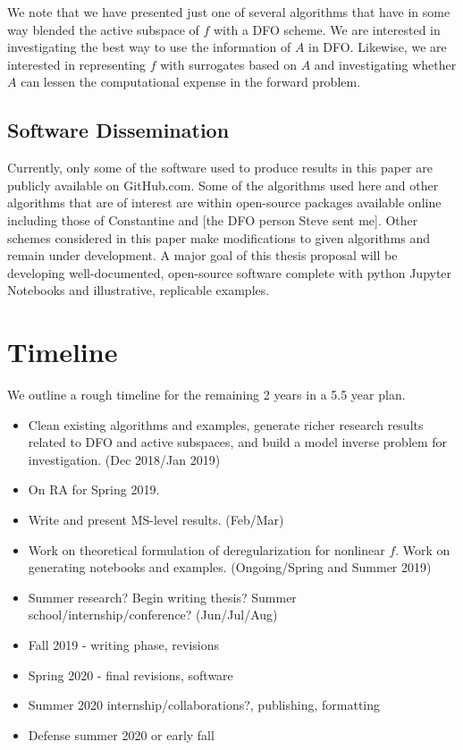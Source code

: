 \documentclass{amsart}
\begin{document}
We note that we have presented just one of several algorithms that have in some way blended the active subspace of $f$ with a DFO scheme. We are interested in investigating the best way to use the information of $A$ in DFO. Likewise, we are interested in representing $f$ with surrogates based on $A$ and investigating whether $A$ can lessen the computational expense in the forward problem.




\subsection{Software Dissemination}

Currently, only some of the software used to produce results in this paper are publicly available on GitHub.com. Some of the algorithms used here and other algorithms that are of interest are within open-source packages available online including those of Constantine and [the DFO person Steve sent me]. Other schemes considered in this paper make modifications to given algorithms and remain under development. A major goal of this thesis proposal will be developing well-documented, open-source software complete with python Jupyter Notebooks and illustrative, replicable examples.

\section{Timeline}

We outline a rough timeline for the remaining 2 years in a 5.5 year plan.

\begin{itemize}

\item Clean existing algorithms and examples, generate richer research results related to DFO and active subspaces, and build a model inverse problem for investigation. (Dec 2018/Jan 2019)

\item On RA for Spring 2019.

\item Write and present MS-level results. (Feb/Mar)

\item Work on theoretical formulation of deregularization for nonlinear $f$. Work on generating notebooks and examples. (Ongoing/Spring and Summer 2019)

\item Summer research? Begin writing thesis? Summer school/internship/conference? (Jun/Jul/Aug)

\item Fall 2019 - writing phase, revisions

\item Spring 2020 - final revisions, software

\item Summer 2020 internship/collaborations?, publishing, formatting

\item Defense summer 2020 or early fall


\end{itemize}
\end{document}
